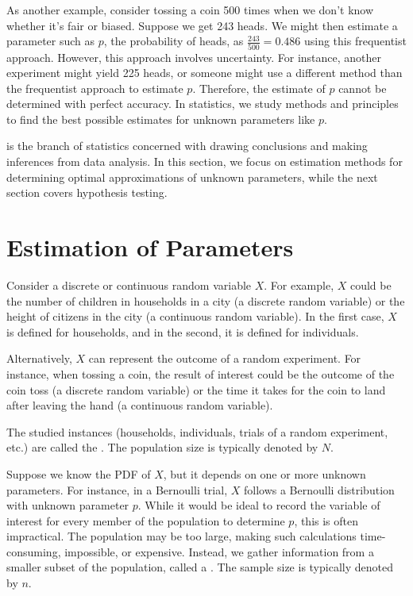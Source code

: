 As another example, consider tossing a coin 500 times when we don't know whether it's fair or biased.
Suppose we get 243 heads.
We might then estimate a parameter such as \( p \), the probability of heads, as \( \frac{243}{500} = 0.486 \) using this frequentist approach.
However, this approach involves uncertainty.
For instance, another experiment might yield 225 heads, or someone might use a different method than the frequentist approach to estimate \( p \).
Therefore, the estimate of \( p \) cannot be determined with perfect accuracy.
In statistics, we study methods and principles to find the best possible estimates for unknown parameters like \( p \).

 is the branch of statistics concerned with drawing conclusions and making inferences from data analysis.
In this section, we focus on estimation methods for determining optimal approximations of unknown parameters,
while the next section covers hypothesis testing.

\section{Estimation of Parameters}

Consider a discrete or continuous random variable  \( X \).
For example, \( X \) could be the number of children in households in a city (a discrete random variable) or the height of citizens in the city (a continuous random variable).
In the first case, \( X \) is defined for households, and in the second, it is defined for individuals.

Alternatively, \( X \) can represent the outcome of a random experiment.
For instance, when tossing a coin, the result of interest could be the outcome of the coin toss (a discrete random variable) or the time it takes for the coin to land after leaving the hand (a continuous random variable).

The studied instances (households, individuals, trials of a random experiment, etc.) are called the .
The population size is typically denoted by \( N \).

Suppose we know the PDF of \( X \), but it depends on one or more unknown parameters.
For instance, in a Bernoulli trial, \( X \) follows a Bernoulli distribution with unknown parameter \( p \).
While it would be ideal to record the variable of interest for every member of the population to determine \( p \), this is often impractical.
The population may be too large, making such calculations time-consuming, impossible, or expensive.
Instead, we gather information from a smaller subset of the population, called a .
The sample size is typically denoted by \( n \).

